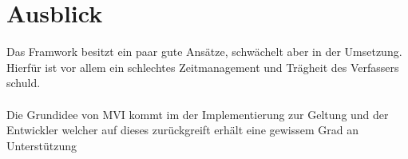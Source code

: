\section{Ausblick}
Das Framwork besitzt ein paar gute Ansätze, schwächelt aber in der Umsetzung. Hierfür ist vor allem ein schlechtes Zeitmanagement und Trägheit des Verfassers schuld.
\\\\
Die Grundidee von MVI kommt im der Implementierung zur Geltung und der Entwickler welcher auf dieses zurückgreift erhält eine gewissem Grad an Unterstützung 